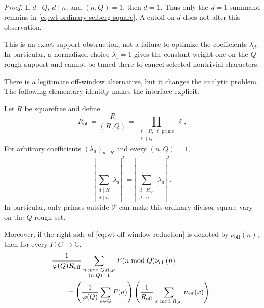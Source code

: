 \begin{proof}
If $d\mid Q$, $d\mid n$, and $(n,Q)=1$, then $d=1$.  Thus only the
$d=1$ summand remains in \eqref{eq:wt-ordinary-selberg-square}.  A cutoff on
$d$ does not alter this observation.
\end{proof}

This is an exact support obstruction, not a failure to optimize the
coefficients $\lambda_d$.  In particular, a normalized choice
$\lambda_1=1$ gives the constant weight one on the $Q$-rough support and
cannot be tuned there to cancel selected nontrivial characters.

There is a legitimate off-window alternative, but it changes the analytic
problem.  The following elementary identity makes the interface explicit.

\begin{lemma}
\label{lem:wt-off-window-interface}
Let $R$ be squarefree and define
\begin{equation}
 R_{\mathrm{off}}
 =\frac{R}{(R,Q)}
 =\prod_{\substack{\ell\mid R,\ \ell\ \mathrm{prime}\\ \ell\nmid Q}}\ell,
 \label{eq:wt-off-window-modulus}
\end{equation}
For arbitrary coefficients
$(\lambda_d)_{d\mid R}$ and every $(n,Q)=1$,
\begin{equation}
 \left|\sum_{\substack{d\mid R\\d\mid n}}\lambda_d\right|^2
 =
 \left|\sum_{\substack{d\mid R_{\mathrm{off}}\\d\mid n}}
       \lambda_d\right|^2.
 \label{eq:wt-off-window-reduction}
\end{equation}
In particular, only primes outside $\mathcal P$ can make this ordinary
divisor square vary on the $Q$-rough set.

Moreover, if the right side of \eqref{eq:wt-off-window-reduction} is denoted
by $\nu_{\mathrm{off}}(n)$, then for every $F:G\to\mathbb C$,
\begin{align}
 &\frac{1}{\varphi(Q)R_{\mathrm{off}}}
  \sum_{\substack{n\bmod QR_{\mathrm{off}}\\(n,Q)=1}}
  F(n\bmod Q)\nu_{\mathrm{off}}(n) \notag\\
 &\qquad=
 \left(\frac1{\varphi(Q)}\sum_{a\in G}F(a)\right)
 \left(\frac1{R_{\mathrm{off}}}
       \sum_{x\bmod R_{\mathrm{off}}}\nu_{\mathrm{off}}(x)\right).
 \label{eq:wt-complete-crt-factorization}
\end{align}
\end{lemma}

